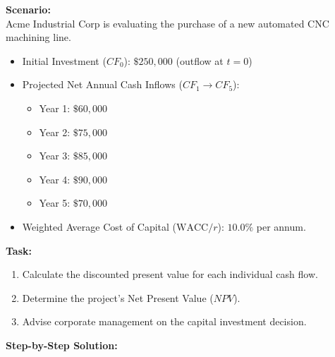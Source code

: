 \documentclass[11pt,a4paper]{article}
\begin{document}
\begin{workedexample}
\textbf{Scenario:}\\
Acme Industrial Corp is evaluating the purchase of a new automated CNC machining line.
\begin{itemize}
  \item Initial Investment ($CF_0$): $\$250,000$ (outflow at $t=0$)
  \item Projected Net Annual Cash Inflows ($CF_1 \to CF_5$):
    \begin{itemize}
      \item Year 1: $\$60,000$
      \item Year 2: $\$75,000$
      \item Year 3: $\$85,000$
      \item Year 4: $\$90,000$
      \item Year 5: $\$70,000$
    \end{itemize}
  \item Weighted Average Cost of Capital ($\text{WACC} / r$): $10.0\%$ per annum.
\end{itemize}

\textbf{Task:}
\begin{enumerate}
  \item Calculate the discounted present value for each individual cash flow.
  \item Determine the project's Net Present Value ($NPV$).
  \item Advise corporate management on the capital investment decision.
\end{enumerate}

\tcbline
\textbf{Step-by-Step Solution:}


\end{workedexample}
\end{document}
